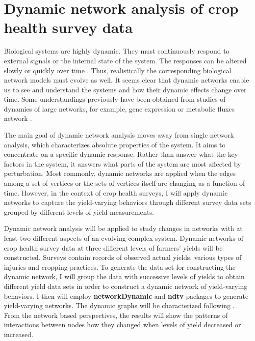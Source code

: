 \section*{Dynamic network analysis of crop health survey data}

Biological systems are highly dynamic. They must continuously respond to external signals or the internal state of the system. The responses can be altered slowly or quickly over time . Thus, realistically the corresponding biological network models must evolve as well.  It seems clear that dynamic networks enable us to see and understand the systems and how their dynamic effects change over time. Some understandings previously have been obtained from studies of dynamics of large networks, for example, gene expression or metabolic fluxes network .

The main goal of dynamic network analysis moves away from single network analysis, which characterizes absolute properties of the system. It aims to concentrate on a specific dynamic response. Rather than answer what the key factors in the system, it answers what parts of the system are most affected by perturbation. Most commonly, dynamic networks are applied when the edges among a set of vertices or the sets of vertices itself are changing as a function of time. However, in the context of crop health surveys, I will apply dynamic networks to capture the yield-varying behaviors through different survey data sets grouped by different levels of yield measurements.

Dynamic network analysis will be applied to study changes in networks with at least two different aspects of an evolving complex system. Dynamic networks of crop health survey data at three different levels of farmers' yields will be constructed. Surveys contain records of observed actual yields, various types of injuries and cropping practices. To generate the data set for constructing the dynamic network, I will group the data with successive levels of yields to obtain different yield data sets in order to construct a dynamic network of yield-varying behaviors. I then will employ \textbf{networkDynamic}  and \textbf{ndtv}  packages to generate yield-varying networks. The dynamic graphs will be characterized following . From the network based perspectives, the results will show the patterns of interactions between nodes how they changed when levels of yield decreased or increased.

